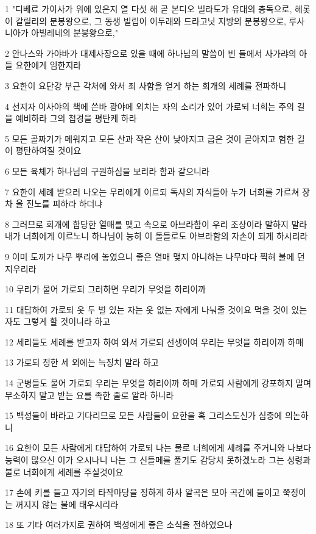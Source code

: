 \par 1 "디베료 가이사가 위에 있은지 열 다섯 해 곧 본디오 빌라도가 유대의 총독으로, 헤롯이 갈릴리의 분봉왕으로, 그 동생 빌립이 이두래와 드라고닛 지방의 분봉왕으로, 루사니아가 아빌레네의 분봉왕으로,"
\par 2 안나스와 가야바가 대제사장으로 있을 때에 하나님의 말씀이 빈 들에서 사가랴의 아들 요한에게 임한지라
\par 3 요한이 요단강 부근 각처에 와서 죄 사함을 얻게 하는 회개의 세례를 전파하니
\par 4 선지자 이사야의 책에 쓴바 광야에 외치는 자의 소리가 있어 가로되 너희는 주의 길을 예비하라 그의 첩경을 평탄케 하라
\par 5 모든 골짜기가 메워지고 모든 산과 작은 산이 낮아지고 굽은 것이 곧아지고 험한 길이 평탄하여질 것이요
\par 6 모든 육체가 하나님의 구원하심을 보리라 함과 같으니라
\par 7 요한이 세례 받으러 나오는 무리에게 이르되 독사의 자식들아 누가 너희를 가르쳐 장차 올 진노를 피하라 하더냐
\par 8 그러므로 회개에 합당한 열매를 맺고 속으로 아브라함이 우리 조상이라 말하지 말라 내가 너희에게 이르노니 하나님이 능히 이 돌들로도 아브라함의 자손이 되게 하시리라
\par 9 이미 도끼가 나무 뿌리에 놓였으니 좋은 열매 맺지 아니하는 나무마다 찍혀 불에 던지우리라
\par 10 무리가 물어 가로되 그러하면 우리가 무엇을 하리이까
\par 11 대답하여 가로되 옷 두 벌 있는 자는 옷 없는 자에게 나눠줄 것이요 먹을 것이 있는 자도 그렇게 할 것이니라 하고
\par 12 세리들도 세례를 받고자 하여 와서 가로되 선생이여 우리는 무엇을 하리이까 하매
\par 13 가로되 정한 세 외에는 늑징치 말라 하고
\par 14 군병들도 물어 가로되 우리는 무엇을 하리이까 하매 가로되 사람에게 강포하지 말며 무소하지 말고 받는 요를 족한 줄로 알라 하니라
\par 15 백성들이 바라고 기다리므로 모든 사람들이 요한을 혹 그리스도신가 심중에 의논하니
\par 16 요한이 모든 사람에게 대답하여 가로되 나는 물로 너희에게 세례를 주거니와 나보다 능력이 많으신 이가 오시나니 나는 그 신들메를 풀기도 감당치 못하겠노라 그는 성령과 불로 너희에게 세례를 주실것이요
\par 17 손에 키를 들고 자기의 타작마당을 정하게 하사 알곡은 모아 곡간에 들이고 쭉정이는 꺼지지 않는 불에 태우시리라
\par 18 또 기타 여러가지로 권하여 백성에게 좋은 소식을 전하였으나
